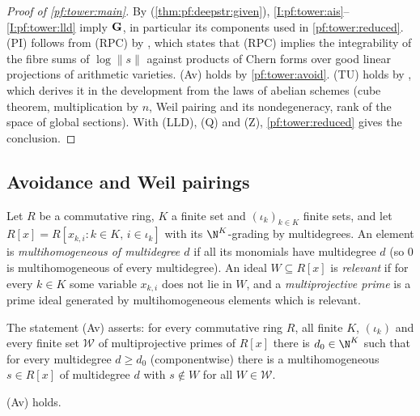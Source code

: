 \begin{proof}[Proof of \cref{pf:tower:main}]
By  (\cref{thm:pf:deepstr:given}),
\ref{I:pf:tower:ais}--\ref{I:pf:tower:lld} imply $\mathbf G$, in particular its components used in
\cref{pf:tower:reduced}. (PI) follows from (RPC) by
, which states that (RPC) implies the
integrability of the fibre sums of $\log\|s\|$ against products of Chern forms over good linear projections
of arithmetic varieties. (Av) holds by \cref{pf:tower:avoid}. (TU) holds by
, which derives it in the development from the laws of
abelian schemes (cube theorem, multiplication by $n$, Weil pairing and its nondegeneracy, rank of the space
of global sections). With (LLD), (Q) and (Z), \cref{pf:tower:reduced} gives the conclusion.
\end{proof}

\subsection{Avoidance and Weil pairings}\label{pf:tower:sec-elem}

Let $R$ be a commutative ring, $K$ a finite set and $(\iota_k)_{k\in K}$ finite sets, and let
$R[x]=R[x_{k,i}:k\in K,\,i\in\iota_k]$ with its $\N^K$-grading by multidegrees. An element is
\emph{multihomogeneous of multidegree $d$} if all its monomials have multidegree $d$ (so $0$ is
multihomogeneous of every multidegree). An ideal $W\subseteq R[x]$ is \emph{relevant} if for every $k\in K$
some variable $x_{k,i}$ does not lie in $W$, and a \emph{multiprojective prime} is a prime ideal generated
by multihomogeneous elements which is relevant.

\begin{definition}\label{pf:tower:def-av}
The statement (Av) asserts: for every commutative ring $R$, all finite $K$, $(\iota_k)$ and every finite set
$\mathcal W$ of multiprojective primes of $R[x]$ there is $d_0\in\N^K$ such that for every multidegree
$d\ge d_0$ (componentwise) there is a multihomogeneous $s\in R[x]$ of multidegree $d$ with $s\notin W$ for all
$W\in\mathcal W$.
\end{definition}

\begin{lemma}\label{pf:tower:avoid}
\textup{(Av)} holds.
\end{lemma}

